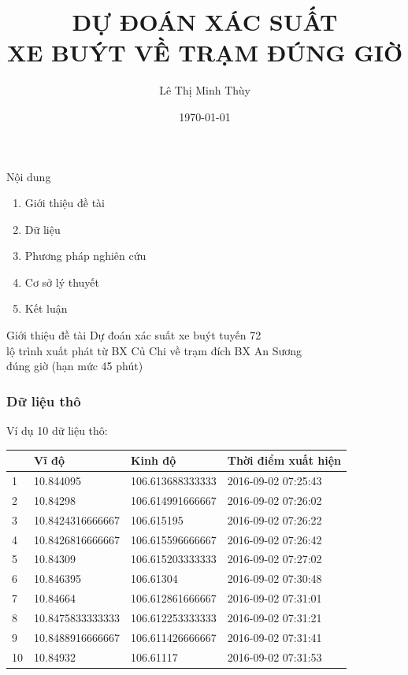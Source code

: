 \documentclass{beamer}
\title[Dự đoán xác suất xe buýt về trạm đúng giờ]{DỰ ĐOÁN XÁC SUẤT \\XE BUÝT VỀ TRẠM ĐÚNG GIỜ} %
\author[Lê Thị Minh Thùy]{Lê Thị Minh Thùy} %
\institute[] %
{
Đại Học Bách Khoa TPHCM \\ %
\medskip
}
\date{\today} %
\begin{document}
\begin{frame}
\titlepage %
\end{frame}

\begin{frame}{Nội dung}
\begin{enumerate}
\item Giới thiệu đề tài
\item Dữ liệu
\item Phương pháp nghiên cứu
\item Cơ sở lý thuyết
\item Kết luận
\end{enumerate}
\end{frame}

\begin{frame}[c]{ Giới thiệu đề tài}
\centering
Dự đoán xác suất xe buýt tuyến 72 \\ lộ trình xuất phát từ BX Củ Chi về trạm đích BX An Sương \\ đúng giờ (hạn mức 45 phút)
\end{frame}


\begin{frame}[t]
\frametitle{Dữ liệu thô}
Ví dụ 10 dữ liệu thô:\\
\begin{flushleft}
\begin{tabular}{ |l|l|l|l| }
\hline
&Vĩ độ & Kinh độ & Thời điểm xuất hiện \\ 
\hline
1&10.844095 & 106.613688333333 & 2016-09-02 07:25:43 \\ 
\hline
2&10.84298 & 106.614991666667 & 2016-09-02 07:26:02 \\
\hline
3&10.8424316666667 & 106.615195 & 2016-09-02 07:26:22 \\
\hline
4&10.8426816666667 & 106.615596666667 & 2016-09-02 07:26:42 \\
\hline
5&10.84309 & 106.615203333333 & 2016-09-02 07:27:02 \\
\hline
6&10.846395 & 106.61304 & 2016-09-02 07:30:48 \\
\hline
7&10.84664 & 106.612861666667 & 2016-09-02 07:31:01 \\
\hline
8&10.8475833333333 & 106.612253333333 & 2016-09-02 07:31:21 \\
\hline
9&10.8488916666667 & 106.611426666667 & 2016-09-02 07:31:41 \\
\hline
10&10.84932 & 106.61117 & 2016-09-02 07:31:53 \\
\hline 
\end{tabular}
\end{flushleft}
\end{frame}
\end{document}
